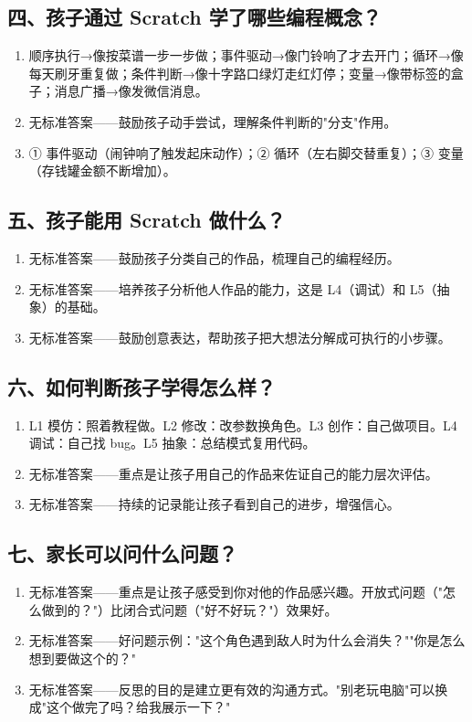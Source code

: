 \documentclass[a4paper,12pt]{ctexart}
\begin{document}
\subsection*{四、孩子通过 Scratch 学了哪些编程概念？}
\begin{enumerate}
  \item 顺序执行→像按菜谱一步一步做；事件驱动→像门铃响了才去开门；循环→像每天刷牙重复做；条件判断→像十字路口绿灯走红灯停；变量→像带标签的盒子；消息广播→像发微信消息。
  \item 无标准答案——鼓励孩子动手尝试，理解条件判断的"分支"作用。
  \item ① 事件驱动（闹钟响了触发起床动作）；② 循环（左右脚交替重复）；③ 变量（存钱罐金额不断增加）。
\end{enumerate}

\subsection*{五、孩子能用 Scratch 做什么？}
\begin{enumerate}
  \item 无标准答案——鼓励孩子分类自己的作品，梳理自己的编程经历。
  \item 无标准答案——培养孩子分析他人作品的能力，这是 L4（调试）和 L5（抽象）的基础。
  \item 无标准答案——鼓励创意表达，帮助孩子把大想法分解成可执行的小步骤。
\end{enumerate}

\subsection*{六、如何判断孩子学得怎么样？}
\begin{enumerate}
  \item L1 模仿：照着教程做。L2 修改：改参数换角色。L3 创作：自己做项目。L4 调试：自己找 bug。L5 抽象：总结模式复用代码。
  \item 无标准答案——重点是让孩子用自己的作品来佐证自己的能力层次评估。
  \item 无标准答案——持续的记录能让孩子看到自己的进步，增强信心。
\end{enumerate}

\subsection*{七、家长可以问什么问题？}
\begin{enumerate}
  \item 无标准答案——重点是让孩子感受到你对他的作品感兴趣。开放式问题（"怎么做到的？"）比闭合式问题（"好不好玩？"）效果好。
  \item 无标准答案——好问题示例："这个角色遇到敌人时为什么会消失？""你是怎么想到要做这个的？"
  \item 无标准答案——反思的目的是建立更有效的沟通方式。"别老玩电脑"可以换成"这个做完了吗？给我展示一下？"
\end{enumerate}
\end{document}

